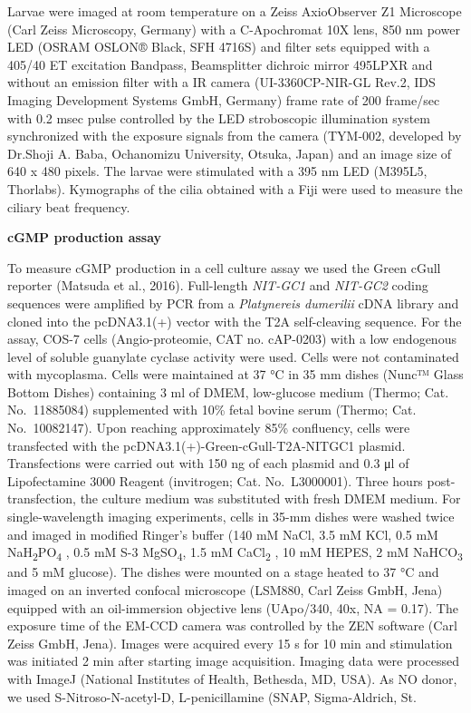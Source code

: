 \documentclass[
  10pt,
  onecolumn]{article}
\begin{document}
Larvae were imaged at room temperature on a Zeiss AxioObserver Z1
Microscope (Carl Zeiss Microscopy, Germany) with a C-Apochromat 10X
lens, 850 nm power LED (OSRAM OSLON® Black, SFH 4716S) and filter sets
equipped with a 405/40 ET excitation Bandpass, Beamsplitter dichroic
mirror 495LPXR and without an emission filter with a IR camera
(UI-3360CP-NIR-GL Rev.2, IDS Imaging Development Systems GmbH, Germany)
frame rate of 200 frame/sec with 0.2 msec pulse controlled by the LED
stroboscopic illumination system synchronized with the exposure signals
from the camera (TYM-002, developed by Dr.Shoji A. Baba, Ochanomizu
University, Otsuka, Japan) and an image size of 640 x 480 pixels. The
larvae were stimulated with a 395 nm LED (M395L5, Thorlabs). Kymographs
of the cilia obtained with a Fiji were used to measure the ciliary beat
frequency.

\textbf{cGMP production assay}

To measure cGMP production in a cell culture assay we used the Green
cGull reporter (Matsuda et al., 2016). Full-length \emph{NIT-GC1} and
\emph{NIT-GC2} coding sequences were amplified by PCR from a
\emph{Platynereis dumerilii} cDNA library and cloned into the
pcDNA3.1(+) vector with the T2A self-cleaving sequence. For the assay,
COS-7 cells (Angio-proteomie, CAT no. cAP-0203) with a low endogenous
level of soluble guanylate cyclase activity were used. Cells were not
contaminated with mycoplasma. Cells were maintained at 37 °C in 35 mm
dishes (Nunc™ Glass Bottom Dishes) containing 3 ml of DMEM, low-glucose
medium (Thermo; Cat. No.~11885084) supplemented with 10\% fetal bovine
serum (Thermo; Cat. No.~10082147). Upon reaching approximately 85\%
confluency, cells were transfected with the
pcDNA3.1(+)-Green-cGull-T2A-NITGC1 plasmid. Transfections were carried
out with 150 ng of each plasmid and 0.3 μl of Lipofectamine 3000 Reagent
(invitrogen; Cat. No.~L3000001). Three hours post-transfection, the
culture medium was substituted with fresh DMEM medium. For
single-wavelength imaging experiments, cells in 35-mm dishes were washed
twice and imaged in modified Ringer's buffer (140 mM NaCl, 3.5 mM KCl,
0.5 mM NaH\textsubscript{2}PO\textsubscript{4} , 0.5 mM S-3
MgSO\textsubscript{4}, 1.5 mM CaCl\textsubscript{2} , 10 mM HEPES, 2 mM
NaHCO\textsubscript{3} and 5 mM glucose). The dishes were mounted on a
stage heated to 37 °C and imaged on an inverted confocal microscope
(LSM880, Carl Zeiss GmbH, Jena) equipped with an oil-immersion objective
lens (UApo/340, 40x, NA = 0.17). The exposure time of the EM-CCD camera
was controlled by the ZEN software (Carl Zeiss GmbH, Jena). Images were
acquired every 15 s for 10 min and stimulation was initiated 2 min after
starting image acquisition. Imaging data were processed with ImageJ
(National Institutes of Health, Bethesda, MD, USA). As NO donor, we used
S-Nitroso-N-acetyl-D, L-penicillamine (SNAP, Sigma-Aldrich, St.
\end{document}
